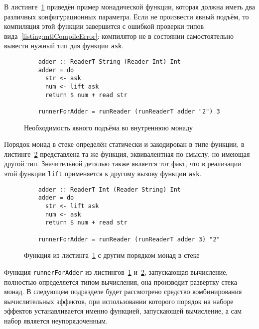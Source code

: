     В листинге~\ref{listing:mtlReadersLift} приведён пример монадической функции,
    которая должна иметь два различных конфигурационных параметра. Если не
    произвести явный подъём, то компиляция этой функции завершится с ошибкой
    проверки типов вида~\ref{listing:mtlCompileError}: компилятор не в состоянии
    самостоятельно вывести нужный тип для функции \lstinline{ask}.

    \begin{figure}[t]
    \begin{lstlisting}
    adder :: ReaderT String (Reader Int) Int
    adder = do
      str <- ask
      num <- lift ask
      return $ num + read str

    runnerForAdder = runReader (runReaderT adder "2") 3
    \end{lstlisting}
    \caption{Необходимость явного подъёма во внутреннюю монаду}
    \label{listing:mtlReadersLift}
    \end{figure}

    Порядок монад в стеке определён статически и закодирован в типе функции,
    в листинге~\ref{listing:mtlDifferentReadersLift} представлена та же функция,
    эквивалентная по смыслу, но имеющая другой тип. Значительной деталью также
    является тот факт, что в реализации этой функции \lstinline{lift} применяется
    к другому вызову функции \lstinline{ask}.

    \begin{figure}[t]
    \begin{lstlisting}
    adder :: ReaderT Int (Reader String) Int
    adder = do
      str <- lift ask
      num <- ask
      return $ num + read str

    runnerForAdder = runReader (runReaderT adder 3) "2"
    \end{lstlisting}
    \caption{Функция из листинга~\ref{listing:mtlReadersLift} с другим порядком монад в стеке}
    \label{listing:mtlDifferentReadersLift}
    \end{figure}

    Функция \lstinline{runnerForAdder} из листингов~\ref{listing:mtlReadersLift}
    и~\ref{listing:mtlDifferentReadersLift}, запускающая вычисление, полностью
    определяется типом вычисления, она производит развёртку стека монад.
    В следующем подразделе будет рассмотрено средство комбинирования вычислительных
    эффектов, при использовании которого порядок на наборе эффектов устанавливается
    именно функцией, запускающей вычисление, а сам набор является неупорядоченным.

